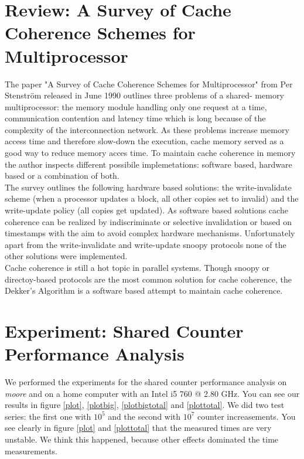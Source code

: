 \documentclass[oneside,a4paper]{scrartcl}
\begin{document}
\section{Review: A Survey of Cache Coherence Schemes for Multiprocessor}
The paper "A Survey of Cache Coherence Schemes for Multiprocessor" from
Per Stenström released in June 1990 outlines three problems of a shared-
memory multiprocessor: the memory module handling only one request at 
a time, communication contention and latency time which is long because 
of the complexity of the interconnection network. As these problems 
increase memory access time and therefore slow-down the execution, cache 
memory served as a good way to reduce memory acces time. To maintain 
cache coherence in memory the author inspects different possibile 
implemetations: software based, hardware based or a combination of both.
\\
The survey outlines the following hardware based solutions: the 
write-invalidate scheme (when a processor updates a block, all other 
copies set to invalid) and the write-update policy (all copies get updated). 
As software based solutions cache coherence can be realized by indiscriminate 
or selective invalidation or based on timestamps with the aim to avoid 
complex hardware mechanisms. Unfortunately apart from the write-invalidate 
and write-update snoopy protocols none of the other solutions were 
implemented. 
\\
Cache coherence is still a hot topic in parallel systems. Though snoopy
or directoy-based protocols are the most common solution for cache coherence, 
the Dekker's Algorithm is a software based attempt to maintain cache coherence.
    

\section{Experiment: Shared Counter Performance Analysis}
We performed the experiments for the shared counter performance
analysis on \emph{moore} and on a home computer with an Intel
i5 760 @ 2.80 GHz. You can see our results in figure \ref{plot}, \ref{plotbig},
\ref{plotbigtotal} and \ref{plottotal}. We did two test series: the first
one with $10^5$ and the second with $10^7$ counter increasements. You
see clearly in figure \ref{plot} and \ref{plottotal} that the measured
times are very unstable. We think this happened, because other effects
dominated the time measurements. 
\end{document}
